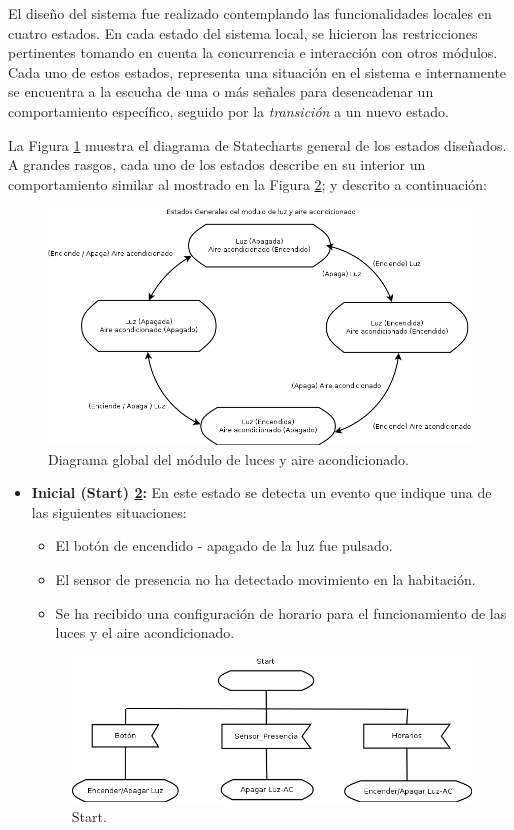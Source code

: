 \documentclass[journal]{IEEEtran}
\begin{document}
El diseño del sistema fue realizado contemplando las funcionalidades locales en cuatro estados.
En cada estado del sistema local, se hicieron las restricciones pertinentes tomando en cuenta la concurrencia e interacción con otros módulos.
Cada uno de estos estados, representa una situación en el sistema e internamente se encuentra a la escucha de una o más señales para desencadenar un comportamiento específico, seguido por la \emph{transición} a un nuevo estado.

La Figura \ref{fig:estados-modelo} muestra el diagrama de Statecharts general de los estados diseñados.
A grandes rasgos, cada uno de los estados describe en su interior un comportamiento similar al mostrado en la Figura \ref{fig:start}; y descrito a continuación:

	\begin{figure}
\centering
\includegraphics[width=\columnwidth]{diagramas/Diagrama_estados.png}
\caption{Diagrama global del módulo de luces y aire acondicionado.}
\label{fig:estados-modelo}
\end{figure}

	
%
\begin{itemize}
	\item \textbf{Inicial (Start) \ref{fig:start}:}
	En este estado se detecta un evento que indique una de las siguientes situaciones:
	\begin{itemize}
		\item El botón de encendido - apagado de la luz fue pulsado.
		\item El sensor de presencia no ha detectado movimiento en la habitación.
		\item Se ha recibido una configuración de horario para el funcionamiento de las luces y el aire acondicionado.
	\end{itemize}
\begin{figure}
\centering
\includegraphics[width=\columnwidth]{diagramas/Diagrama_principal.png}
\caption{Start.}
\label{fig:start}
\end{figure}
\end{itemize}
\end{document}
